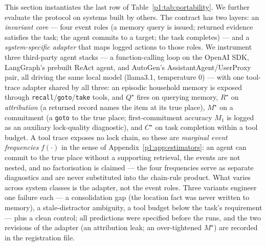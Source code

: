 \documentclass{article}
\newcommand{\method}[1]{\texttt{#1}}
\begin{document}
This section instantiates the last row of
Table~\ref{p1:tab:portability}. We further evaluate the protocol on
systems built by others. The contract has two layers: an \emph{invariant core} --- four event
roles (a memory query is issued; returned evidence satisfies the
task; the agent commits to a target; the task completes) --- and a
\emph{system-specific adapter} that maps logged actions to those
roles. We instrument three third-party agent stacks --- a
function-calling loop on the OpenAI SDK, LangGraph's prebuilt ReAct
agent, and AutoGen's AssistantAgent/UserProxy pair, all driving the
same local model (llama3.1, temperature $0$) --- with one tool-trace
adapter shared by all three: an episodic household memory is exposed
through \method{recall}/\method{goto}/\method{take} tools, and
$Q^\star$ fires on querying memory, $R^\star$ on \emph{attribution}
(a returned record names the item at its true place), $M^\star$ on a
commitment (a \method{goto} to the true place; first-commitment
accuracy $M_1$ is logged as an auxiliary lock-quality diagnostic),
and $C^\star$ on task completion within a tool budget. A tool trace
exposes no lock chain, so these are \emph{marginal event frequencies}
$f(\cdot)$ in the sense of Appendix~\ref{p1:app:estimators}: an agent
can commit to the true place without a supporting retrieval, the
events are not nested, and no factorisation is claimed --- the four
frequencies serve as separate diagnostics and are never substituted
into the chain-rule product. What varies across system
classes is the adapter, not the event roles. Three variants engineer
one failure each --- a consolidation gap (the location fact was never
written to memory), a stale-distractor ambiguity, a tool budget below
the task's requirement --- plus a clean control; all predictions were
specified before the runs, and the two revisions of the adapter (an
attribution leak; an over-tightened $M^\star$) are recorded in the
registration file.
\end{document}

